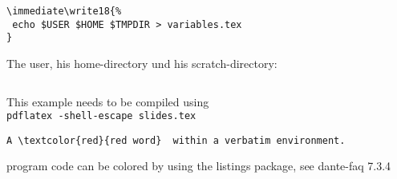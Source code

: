 \documentclass[11pt, a4paper, landscape]{article}
\begin{document}
\NewPage{}
\vfill
\begin{verbatim}
\immediate\write18{% 
 echo $USER $HOME $TMPDIR > variables.tex
}
\end{verbatim}
The user, his home-directory und his scratch-directory:
\begin{verbatim}

\end{verbatim}
\ifpdf
\immediate{}
\alert{}
\else
\vfill
This example needs to be compiled using \\ \alert{\texttt{pdflatex -shell-escape slides.tex}}
\fi
\vfill


\NewPage{}
\vfill
\begin{Verbatim}[commandchars=\\\{\}] 
  A \textcolor{red}{red word}  within a verbatim environment. 
\end{Verbatim} 
\vfill
program code can be colored by using the listings package, see dante-faq 7.3.4
\vfill

\end{document}
